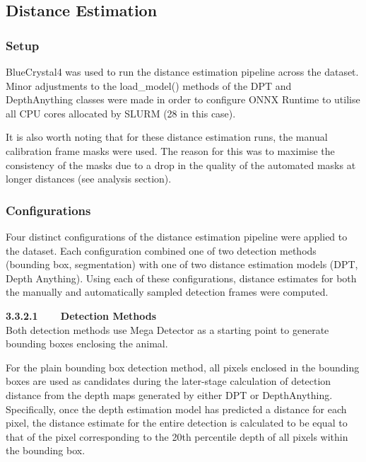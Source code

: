 \subsection{Distance Estimation}

\subsubsection{Setup}

BlueCrystal4 was used to run the distance estimation pipeline across the dataset.
Minor adjustments to the load\_model() methods of the DPT and DepthAnything classes
were made in order to configure ONNX Runtime to utilise all CPU cores allocated by
SLURM (28 in this case).

It is also worth noting that for these distance estimation runs, the manual calibration
frame masks were used.
The reason for this was to maximise the consistency of the masks due to a drop in the
quality of the automated masks at longer distances (see analysis section).

\subsubsection{Configurations}\label{subsubsec:configuratons}

Four distinct configurations of the distance estimation pipeline were applied to the
dataset.
Each configuration combined one of two detection methods (bounding box, segmentation) with one
of two distance estimation models (DPT, Depth Anything).
Using each of these configurations, distance estimates for both the manually and automatically
sampled detection frames were computed.

\vspace{3mm}

\textbf{3.3.2.1~~~~Detection Methods}\vspace{4.5mm}\\
Both detection methods use Mega Detector as a starting point to generate bounding boxes
enclosing the animal.

For the plain bounding box detection method, all pixels enclosed in the bounding boxes are used
as candidates during the later-stage calculation of detection distance from the depth maps
generated by either DPT or DepthAnything.
Specifically, once the depth estimation model has predicted a distance for each pixel, the
distance estimate for the entire detection is calculated to be equal to that of the pixel
corresponding to the 20th percentile depth of all pixels within the bounding box.


